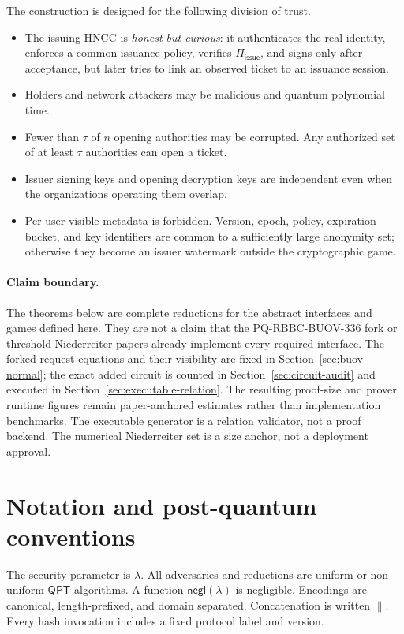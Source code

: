 \documentclass[11pt]{article}
\newcommand{\Piiss}{\Pi_{\mathsf{issue}}}
\newcommand{\negl}{\mathsf{negl}}
\newcommand{\QPT}{\mathsf{QPT}}
\begin{document}
The construction is designed for the following division of trust.

\begin{itemize}[leftmargin=*]
  \item The issuing HNCC is \emph{honest but curious}: it authenticates the real
  identity, enforces a common issuance policy, verifies $\Piiss$, and signs only
  after acceptance, but later tries to link an observed ticket to an issuance
  session.
  \item Holders and network attackers may be malicious and quantum polynomial
  time.
  \item Fewer than $\tau$ of $n$ opening authorities may be corrupted.  Any
  authorized set of at least $\tau$ authorities can open a ticket.
  \item Issuer signing keys and opening decryption keys are independent even when
  the organizations operating them overlap.
  \item Per-user visible metadata is forbidden.  Version, epoch, policy,
  expiration bucket, and key identifiers are common to a sufficiently large
  anonymity set; otherwise they become an issuer watermark outside the
  cryptographic game.
\end{itemize}

\paragraph{Claim boundary.}
The theorems below are complete reductions for the abstract interfaces and games
defined here.  They are not a claim that the PQ-RBBC-BUOV-336 fork or threshold
Niederreiter papers already implement every required interface.  The forked
request equations and their visibility are fixed in
Section~\ref{sec:buov-normal}; the exact added
circuit is counted in Section~\ref{sec:circuit-audit} and executed in
Section~\ref{sec:executable-relation}.  The resulting proof-size and prover
runtime figures remain paper-anchored estimates rather than implementation
benchmarks.  The executable generator is a relation validator, not a proof
backend.  The numerical Niederreiter set is a size anchor, not a deployment
approval.

\section{Notation and post-quantum conventions}

The security parameter is $\lambda$.  All adversaries and reductions are
uniform or non-uniform $\QPT$ algorithms.  A function $\negl(\lambda)$ is
negligible.  Encodings are canonical, length-prefixed, and domain separated.
Concatenation is written $\|$.  Every hash invocation includes a fixed protocol
label and version.
\end{document}
